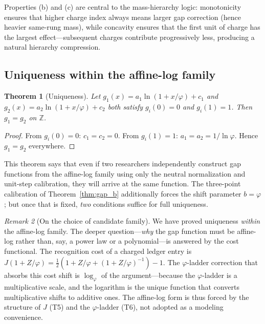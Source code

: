 \documentclass[11pt,a4paper]{article}
\newtheorem{theorem}{Theorem}[section]
\theoremstyle{definition}
\theoremstyle{remark}
\newtheorem{remark}[theorem]{Remark}
\newcommand{\phig}{\varphi}
\newcommand{\Jcost}{J}
\newcommand{\Zidx}{Z}
\begin{document}
\noindent
Properties (b) and (c) are central to the mass-hierarchy logic:
monotonicity ensures that higher charge index always means larger gap
correction (hence heavier same-rung mass), while concavity ensures that
the first unit of charge has the largest effect---subsequent charges
contribute progressively less, producing a natural hierarchy compression.

\subsection{Uniqueness within the affine-log family}

\begin{theorem}[Uniqueness]
\label{thm:gap_unique}
Let $g_1(x) = a_1 \ln(1 + x/\phig) + c_1$ and
$g_2(x) = a_2 \ln(1 + x/\phig) + c_2$ both satisfy
$g_i(0) = 0$ and $g_i(1) = 1$.  Then $g_1 = g_2$ on $\mathbb{Z}$.
\end{theorem}

\begin{proof}
From $g_i(0) = 0$: $c_1 = c_2 = 0$.
From $g_i(1) = 1$: $a_1 = a_2 = 1/\ln\phig$.
Hence $g_1 = g_2$ everywhere.
\end{proof}

\noindent
This theorem says that even if two researchers independently construct gap
functions from the affine-log family using only the neutral normalization and
unit-step calibration, they will arrive at the same function.  The three-point
calibration of Theorem~\ref{thm:gap_b} additionally forces the shift
parameter $b = \phig$; but once that is fixed, \emph{two} conditions
suffice for full uniqueness.

\begin{remark}[On the choice of candidate family]
\label{rem:gap_family_choice}
We have proved uniqueness \emph{within} the affine-log family.
The deeper question---\emph{why} the gap function must be affine-log rather
than, say, a power law or a polynomial---is answered by the cost functional.
The recognition cost of a charged ledger entry is
$\Jcost(1 + \Zidx/\phig) = \frac{1}{2}(1 + \Zidx/\phig + (1 + \Zidx/\phig)^{-1}) - 1$.
The $\phig$-ladder correction that absorbs this cost shift is
$\log_\phig$ of the argument---because the $\phig$-ladder is a multiplicative
scale, and the logarithm is the unique function that converts multiplicative
shifts to additive ones.  The affine-log form is thus forced by the structure
of $\Jcost$ (T5) and the $\phig$-ladder (T6), not adopted as a modeling
convenience.
\end{remark}
\end{document}
